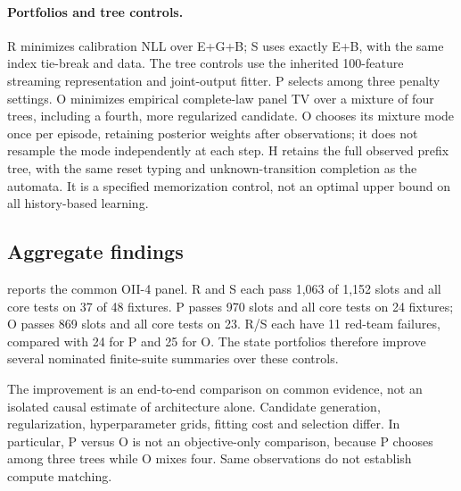 \paragraph{Portfolios and tree controls.}
R minimizes calibration NLL over E+G+B; S uses exactly E+B, with the same index tie-break and data. The tree controls use the inherited 100-feature streaming representation and joint-output fitter. P selects among three penalty settings. O minimizes empirical complete-law panel TV over a mixture of four trees, including a fourth, more regularized candidate. O chooses its mixture mode once per episode, retaining posterior weights after observations; it does not resample the mode independently at each step. H retains the full observed prefix tree, with the same reset typing and unknown-transition completion as the automata. It is a specified memorization control, not an optimal upper bound on all history-based learning.

\subsection{Aggregate findings}\label{p3:c10}
 reports the common OII-4 panel. R and S each pass 1,063 of 1,152 slots and all core tests on 37 of 48 fixtures. P passes 970 slots and all core tests on 24 fixtures; O passes 869 slots and all core tests on 23. R/S each have 11 red-team failures, compared with 24 for P and 25 for O. The state portfolios therefore improve several nominated finite-suite summaries over these controls.

The improvement is an end-to-end comparison on common evidence, not an isolated causal estimate of architecture alone. Candidate generation, regularization, hyperparameter grids, fitting cost and selection differ. In particular, P versus O is not an objective-only comparison, because P chooses among three trees while O mixes four. Same observations do not establish compute matching.


